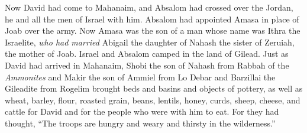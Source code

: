 \begin{biblechapter}
\verse Now David had come to Mahanaim, and Absalom had crossed over the Jordan, he and all the men of Israel with him.
\verse Absalom had appointed Amasa in place of Joab over the army. Now Amasa was the son of a man whose name was Ithra the Israelite, \textit{who had married} Abigail the daughter of Nahash the sister of Zeruiah, the mother of Joab.
\verse Israel and Absalom camped in the land of Gilead.
\verse Just as David had arrived in Mahanaim, Shobi the son of Nahash from Rabbah of the \textit{Ammonites} and Makir the son of Ammiel from Lo Debar and Barzillai the Gileadite from Rogelim
\verse brought beds and basins and objects of pottery, as well as wheat, barley, flour, roasted grain, beans, lentils,
\verse honey, curds, sheep, cheese, and cattle for David and for the people who were with him to eat. For they had thought, “The troops are hungry and weary and thirsty in the wilderness.”
\end{biblechapter}

